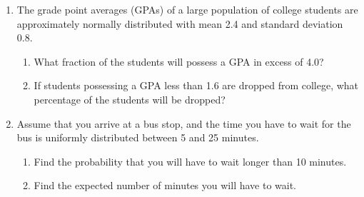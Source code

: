 \documentclass[10pt]{article}
\begin{document}
\begin{enumerate}[label=\arabic*.,align=left,leftmargin=*,labelsep=.5em]
\begin{enumerate}[label=(\alph*),left=0pt,widest=a,topsep=0ex]
  \end{enumerate}
  \newpage
  \item The grade point averages (GPAs) of a large population of college students are approximately normally distributed with mean 2.4 and standard deviation 0.8.
  \begin{enumerate}[label=(\alph*),left=0pt,widest=a,topsep=0ex]
    \item What fraction of the students will possess a GPA in excess of 4.0?
    \item If students possessing a GPA less than 1.6 are dropped from college, what percentage of the students will be dropped?
  \end{enumerate}
  \newpage
  \item Assume that you arrive at a bus stop, and the time you have to wait for the bus is uniformly distributed between 5 and 25 minutes.
  \begin{enumerate}[label=(\alph*),left=0pt,widest=a,topsep=0ex]
    \item Find the probability that you will have to wait longer than 10 minutes.
    \item Find the expected number of minutes you will have to wait.
  \end{enumerate}
\end{enumerate}
\end{document}
